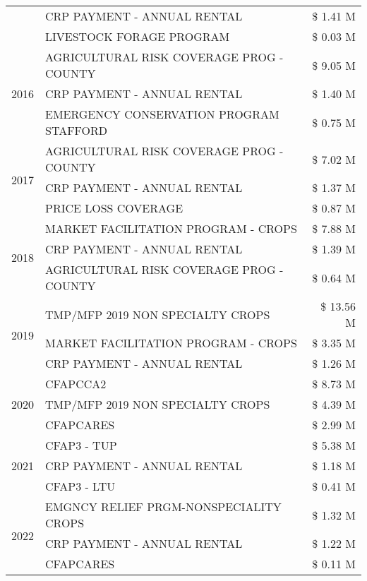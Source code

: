 \begin{tabular}{llr}
 & CRP PAYMENT - ANNUAL RENTAL & \$ 1.41 M \\
 & LIVESTOCK FORAGE PROGRAM & \$ 0.03 M \\
\cline{1-3}
\multirow[t]{3}{*}{2016} & AGRICULTURAL RISK COVERAGE PROG - COUNTY & \$ 9.05 M \\
 & CRP PAYMENT - ANNUAL RENTAL & \$ 1.40 M \\
 & EMERGENCY CONSERVATION PROGRAM STAFFORD & \$ 0.75 M \\
\cline{1-3}
\multirow[t]{3}{*}{2017} & AGRICULTURAL RISK COVERAGE PROG - COUNTY & \$ 7.02 M \\
 & CRP PAYMENT - ANNUAL RENTAL & \$ 1.37 M \\
 & PRICE LOSS COVERAGE & \$ 0.87 M \\
\cline{1-3}
\multirow[t]{3}{*}{2018} & MARKET FACILITATION PROGRAM - CROPS & \$ 7.88 M \\
 & CRP PAYMENT - ANNUAL RENTAL & \$ 1.39 M \\
 & AGRICULTURAL RISK COVERAGE PROG - COUNTY & \$ 0.64 M \\
\cline{1-3}
\multirow[t]{3}{*}{2019} & TMP/MFP 2019 NON SPECIALTY CROPS & \$ 13.56 M \\
 & MARKET FACILITATION PROGRAM - CROPS & \$ 3.35 M \\
 & CRP PAYMENT - ANNUAL RENTAL & \$ 1.26 M \\
\cline{1-3}
\multirow[t]{3}{*}{2020} & CFAPCCA2 & \$ 8.73 M \\
 & TMP/MFP 2019 NON SPECIALTY CROPS & \$ 4.39 M \\
 & CFAPCARES & \$ 2.99 M \\
\cline{1-3}
\multirow[t]{3}{*}{2021} & CFAP3 - TUP & \$ 5.38 M \\
 & CRP PAYMENT - ANNUAL RENTAL & \$ 1.18 M \\
 & CFAP3 - LTU & \$ 0.41 M \\
\cline{1-3}
\multirow[t]{3}{*}{2022} & EMGNCY RELIEF PRGM-NONSPECIALITY CROPS & \$ 1.32 M \\
 & CRP PAYMENT - ANNUAL RENTAL & \$ 1.22 M \\
 & CFAPCARES & \$ 0.11 M \\
\cline{1-3}
\bottomrule
\end{tabular}
